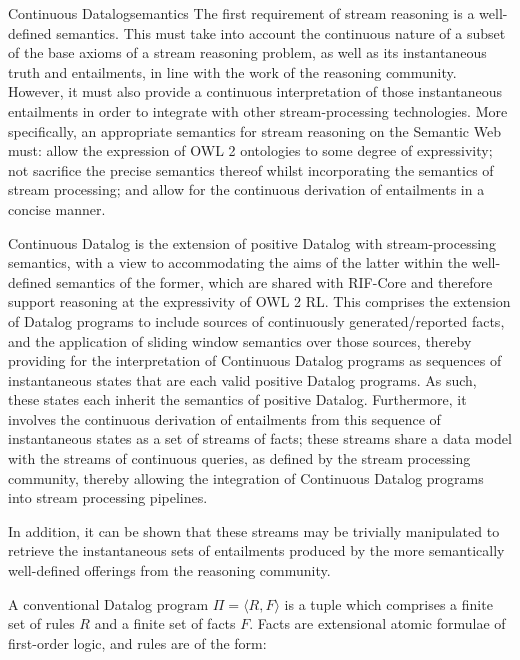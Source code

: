 \begin{nestedsection}{Continuous Datalog}{semantics}
The first requirement of stream reasoning is a well-defined semantics.
This must take into account the continuous nature of a subset of the
base axioms of a stream reasoning problem, as well as its
instantaneous truth and entailments, in line with the work of the
reasoning community.  However, it must also provide a continuous
interpretation of those instantaneous entailments in order to
integrate with other stream-processing technologies.  More
specifically, an appropriate semantics for stream reasoning on the
Semantic Web must: allow the expression of OWL 2 ontologies to some
degree of expressivity; not sacrifice the precise semantics thereof
whilst incorporating the semantics of stream processing; and allow for
the continuous derivation of entailments in a concise manner.

	Continuous Datalog is the extension of positive Datalog with stream-processing semantics, with a view to accommodating the aims of the latter within the well-defined semantics of the former, which are shared with RIF-Core and therefore support reasoning at the expressivity of OWL 2 RL.
	This comprises the extension of Datalog programs to include sources of continuously generated/reported facts, and the application of sliding window semantics over those sources, thereby providing for the interpretation of Continuous Datalog programs as sequences of instantaneous states that are each valid positive Datalog programs.
	As such, these states each inherit the semantics of positive Datalog.
	Furthermore, it involves the continuous derivation of entailments from this sequence of instantaneous states as a set of streams of facts;
	these streams share a data model with the streams of continuous queries, as defined by the stream processing community, thereby allowing the integration of Continuous Datalog programs into stream processing pipelines.

In addition, it can be shown that these streams may be trivially
manipulated to retrieve the instantaneous sets of entailments produced
by the more semantically well-defined offerings from the reasoning
community.


\begin{definition}
\label{def:continuous datalog: datalog program}
A conventional Datalog program $\Pi = \langle R, F\rangle$ is a tuple
which comprises a finite set of rules $R$ and a finite set of facts
$F$. Facts are extensional atomic formulae of first-order logic, and
rules are of the form:


\end{definition}
\end{nestedsection}
